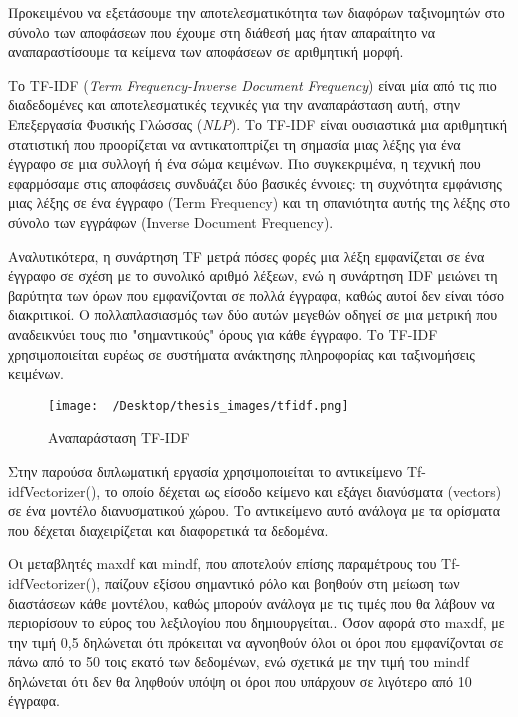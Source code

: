\documentclass[diploma]{softlab-thesis}
\begin{document}
\begin{enumerate}
\begin{enumerate}
Προκειμένου να εξετάσουμε την αποτελεσματικότητα των διαφόρων ταξινομητών στο σύνολο των αποφάσεων που έχουμε στη διάθεσή μας ήταν απαραίτητο να αναπαραστίσουμε τα κείμενα των αποφάσεων σε αριθμητική μορφή.

Το TF-IDF (\textit{Term Frequency-Inverse Document Frequency}) είναι μία από τις πιο διαδεδομένες και αποτελεσματικές τεχνικές για την αναπαράσταση αυτή, στην Επεξεργασία Φυσικής Γλώσσας (\textit{NLP}). Το TF-IDF είναι ουσιαστικά μια αριθμητική στατιστική που προορίζεται να αντικατοπτρίζει τη σημασία μιας λέξης για ένα έγγραφο σε μια συλλογή ή ένα σώμα κειμένων. Πιο συγκεκριμένα, η τεχνική που εφαρμόσαμε στις αποφάσεις συνδυάζει δύο βασικές έννοιες: τη συχνότητα εμφάνισης μιας λέξης σε ένα έγγραφο (Term Frequency) και τη σπανιότητα αυτής της λέξης στο σύνολο των εγγράφων (Inverse Document Frequency).

Αναλυτικότερα, η συνάρτηση TF μετρά πόσες φορές μια λέξη εμφανίζεται σε ένα έγγραφο σε σχέση με το συνολικό αριθμό λέξεων, ενώ η συνάρτηση IDF μειώνει τη βαρύτητα των όρων που εμφανίζονται σε πολλά έγγραφα, καθώς αυτοί δεν είναι τόσο διακριτικοί. Ο πολλαπλασιασμός των δύο αυτών μεγεθών οδηγεί σε μια μετρική που αναδεικνύει τους πιο "σημαντικούς" όρους για κάθε έγγραφο. Το TF-IDF χρησιμοποιείται ευρέως σε συστήματα ανάκτησης πληροφορίας και ταξινομήσεις κειμένων.

\begin{figure}[h]
    \centering
    \texttt{[image: ~/Desktop/thesis\_images/tfidf.png]} %
    \caption{Αναπαράσταση TF-IDF}
    \label{fig:your_image_label}
\end{figure}


Στην παρούσα διπλωματική εργασία χρησιμοποιείται το αντικείμενο Tf-idfVectorizer(), το οποίο δέχεται ως είσοδο κείμενο και εξάγει διανύσματα (vectors) σε ένα μοντέλο διανυσματικού χώρου. Το αντικείμενο αυτό ανάλογα με τα ορίσματα που δέχεται διαχειρίζεται και διαφορετικά τα δεδομένα. 


Οι μεταβλητές maxdf και mindf, που αποτελούν επίσης παραμέτρους του Tf-idfVectorizer(), παίζουν εξίσου σημαντικό ρόλο και βοηθούν στη μείωση των διαστάσεων κάθε μοντέλου, καθώς μπορούν ανάλογα με τις τιμές που θα λάβουν να περιορίσουν το εύρος του λεξιλογίου που δημιουργείται.. Όσον αφορά στο maxdf, με την τιμή 0,5 δηλώνεται ότι πρόκειται να αγνοηθούν όλοι οι όροι που εμφανίζονται σε πάνω από το 50 τοις εκατό των δεδομένων, ενώ σχετικά με την τιμή του mindf δηλώνεται ότι δεν θα ληφθούν υπόψη οι όροι που υπάρχουν σε λιγότερο από 10 έγγραφα.




\end{enumerate}
\end{enumerate}
\end{document}
